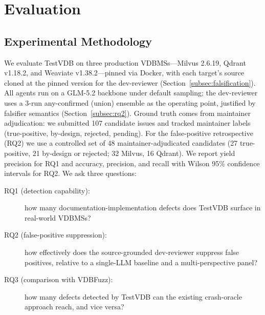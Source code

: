 \documentclass[sigconf]{acmart}
\begin{document}
\section{Evaluation}
\label{sec:eval}

\subsection{Experimental Methodology}
\label{subsec:methodology}

We evaluate TestVDB on three production VDBMSs---Milvus 2.6.19, Qdrant v1.18.2, and Weaviate v1.38.2---pinned via Docker, with each target's source cloned at the pinned version for the dev-reviewer (Section~\ref{subsec:falsification}). All agents run on a GLM-5.2 backbone under default sampling; the dev-reviewer uses a 3-run any-confirmed (union) ensemble as the operating point, justified by falsifier semantics (Section~\ref{subsec:rq2}). Ground truth comes from maintainer adjudication: we submitted 107 candidate issues and tracked maintainer labels (true-positive, by-design, rejected, pending). For the false-positive retrospective (RQ2) we use a controlled set of 48 maintainer-adjudicated candidates (27 true-positive, 21 by-design or rejected; 32 Milvus, 16 Qdrant). We report yield precision for RQ1 and accuracy, precision, and recall with Wilson 95\% confidence intervals for RQ2. We ask three questions:
\begin{description}
  \item[RQ1 (detection capability):] how many documentation-implementation defects does TestVDB surface in real-world VDBMSs?
  \item[RQ2 (false-positive suppression):] how effectively does the source-grounded dev-reviewer suppress false positives, relative to a single-LLM baseline and a multi-perspective panel?
  \item[RQ3 (comparison with VDBFuzz):] how many defects detected by TestVDB can the existing crash-oracle approach reach, and vice versa?
\end{description}
\end{document}
